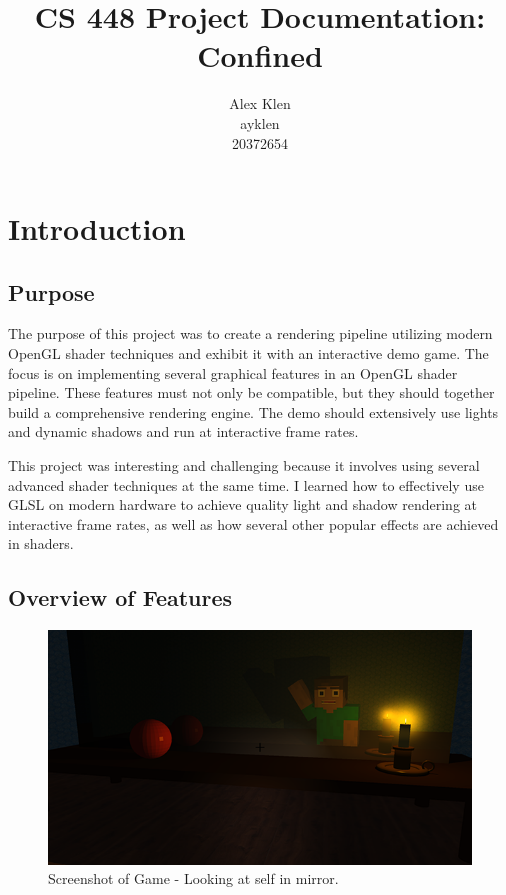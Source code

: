 \documentclass{book}
\title{\huge CS 448  Project Documentation: Confined}
\author{Alex Klen \\ ayklen \\ 20372654}
\begin{document}
\maketitle
\tableofcontents

\chapter{Introduction}
  \section{Purpose}
    The purpose of this project was to create a rendering pipeline utilizing modern OpenGL shader techniques and exhibit it with an interactive demo game.
    The focus is on implementing several graphical features in an OpenGL shader pipeline. These features must not only be compatible, but they should together build a comprehensive rendering engine.
    The demo should extensively use lights and dynamic shadows and run at interactive frame rates.

    This project was interesting and challenging because it involves using several advanced shader techniques at the same time. I learned how to effectively use GLSL on modern hardware to achieve quality light and shadow rendering at interactive frame rates, as well as how several other popular effects are achieved in shaders.

  \section{Overview of Features}
    \begin{figure}[h!]
      \centering
      \includegraphics[width=1.0\textwidth]{screenshot01.png}
      \caption{Screenshot of Game - Looking at self in mirror.}
      \label{screenshot01}
    \end{figure}
\end{document}
